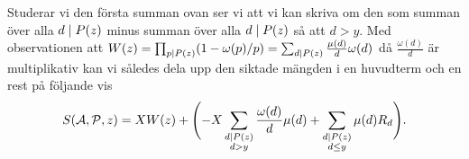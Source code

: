 Studerar vi den första summan ovan ser vi att vi kan skriva om den som summan över alla \(d \mid P(z)\) minus summan över alla \(d \mid P(z)\) så att \(d > y\).
Med observationen att \(W(z) = \prod_{p \mid P(z)} (1 - \omega(p)/p) = \sum_{d \mid P(z)} \frac{\mu(d)}{d} \omega(d)\) då \(\frac{\omega(d)}{d}\) är multiplikativ kan vi således dela upp den siktade mängden i en huvudterm och en rest på följande vis
\begin{align*}
    S(\mathcal{A}, \mathcal{P}, z) = X W(z) + \Biggl(- X \sum_{\substack{d \mid P(z) \\ d > y}} \frac{\omega(d)}{d} \mu(d) + \sum_{\substack{d \mid P(z)  \\ d \leq y}} \mu(d) R_d \Biggr).
\end{align*}

